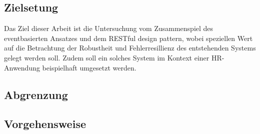 
\subsection{Zielsetung}
Das Ziel dieser Arbeit ist die Untersuchung vom Zusammenspiel des eventbasierten Ansatzes und dem \ac{REST}ful design pattern, wobei speziellen Wert auf die Betrachtung der Robustheit und Fehlerresillienz des entstehenden Systems gelegt werden soll. Zudem soll ein solches System im Kontext einer HR-Anwendung beispielhaft umgesetzt werden.
\subsection{Abgrenzung}
\subsection{Vorgehensweise}